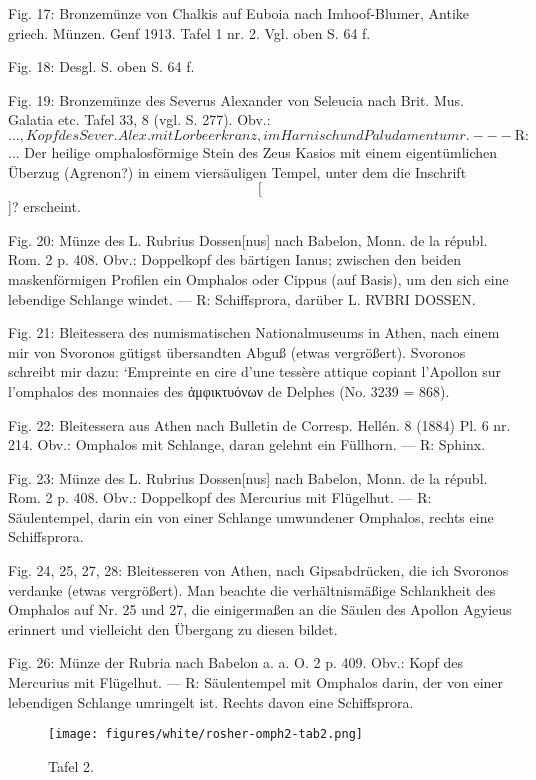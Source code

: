 \documentclass[a4paper, 11pt, oneside]{article}
\newcommand*\svgABX{}
\newcommand*\svgABY{}
\newcommand*\svgABZ{}
\newcommand*\svgACA{}
\newcommand*\svgACB{}
\begin{document}
Fig. 17: Bronzemünze von Chalkis auf Euboia nach Imhoof-Blumer, Antike griech. Münzen. Genf 1913. Tafel 1 nr. 2. Vgl. oben S. 64 f.

Fig. 18: Desgl. S. oben S. 64 f.

Fig. 19: Bronzemünze des Severus Alexander von Seleucia nach Brit. Mus. Galatia etc. Tafel 33, 8 (vgl. S. 277). Obv.: $\svgABX\svgABY$..., Kopf des Sever. Alex. mit Lorbeerkranz, im Harnisch und Paludamentum r. --- ℞: $\svgABZ$... Der heilige omphalosförmige Stein des Zeus Kasios mit einem eigentümlichen Überzug (Agrenon?) in einem viersäuligen Tempel, unter dem die Inschrift $\svgACA$[$\svgACB$]? erscheint.

Fig. 20: Münze des L. Rubrius Dossen[nus] nach Babelon, Monn. de la républ. Rom. 2 p. 408. Obv.: Doppelkopf des bärtigen Ianus; zwischen den beiden maskenförmigen Profilen ein Omphalos oder Cippus (auf Basis), um den sich eine lebendige Schlange windet. --- ℞: Schiffsprora, darüber L. RVBRI DOSSEN.

Fig. 21: Bleitessera des numismatischen Nationalmuseums in Athen, nach einem mir von Svoronos gütigst übersandten Abguß (etwas vergrößert). Svoronos schreibt mir dazu: `Empreinte en cire d'une tessère attique copiant l'Apollon sur l'omphalos des monnaies des ἀμφικτυόνων de Delphes (No. 3239 = 868).

Fig. 22: Bleitessera aus Athen nach Bulletin de Corresp. Hellén. 8 (1884) Pl. 6 nr. 214. Obv.: Omphalos mit Schlange, daran gelehnt ein Füllhorn. --- ℞: Sphinx.

Fig. 23: Münze des L. Rubrius Dossen[nus] nach Babelon, Monn. de la républ. Rom. 2 p. 408. Obv.: Doppelkopf des Mercurius mit Flügelhut. --- ℞: Säulentempel, darin ein von einer Schlange umwundener Omphalos, rechts eine Schiffsprora.

Fig. 24, 25, 27, 28: Bleitesseren von Athen, nach Gipsabdrücken, die ich Svoronos verdanke (etwas vergrößert). Man beachte die verhältnismäßige Schlankheit des Omphalos auf Nr. 25 und 27, die einigermaßen an die Säulen des Apollon Agyieus erinnert und vielleicht den Übergang zu diesen bildet.

Fig. 26: Münze der Rubria nach Babelon a. a. O. 2 p. 409. Obv.: Kopf des Mercurius mit Flügelhut. --- ℞: Säulentempel mit Omphalos darin, der von einer lebendigen Schlange umringelt ist. Rechts davon eine Schiffsprora.
\clearpage
\vspace*{\fill}
\begin{figure}[H]
\centering
\texttt{[image: figures/white/rosher-omph2-tab2.png]}
\caption{Tafel 2.}
\end{figure}
\vspace*{\fill}
\clearpage
\end{document}
